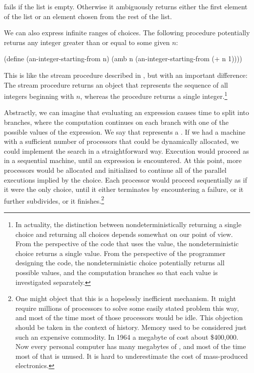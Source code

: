 \noindent
{} fails if the list is empty.  Otherwise it ambiguously
returns either the first element of the list or an element chosen from the rest
of the list.

We can also express infinite ranges of choices.  The following procedure
potentially returns any integer greater than or equal to some given \( n \):

\begin{codeBlock}
(define (an-integer-starting-from n)
  (amb n (an-integer-starting-from (+ n 1))))
\end{codeBlock}

\noindent
This is like the stream procedure  described in
, but with an important difference: The stream procedure
returns an object that represents the sequence of all integers beginning with
\( n \), whereas the  procedure returns a single integer.\footnote{In
actuality, the distinction between nondeterministically returning a single
choice and returning all choices depends somewhat on our point of view.  From
the perspective of the code that uses the value, the nondeterministic choice
returns a single value.  From the perspective of the programmer designing the
code, the nondeterministic choice potentially returns all possible values, and
the computation branches so that each value is investigated separately.}

Abstractly, we can imagine that evaluating an  expression causes time
to split into branches, where the computation continues on each branch with one
of the possible values of the expression.  We say that  represents a
.  If we had a machine with a sufficient
number of processors that could be dynamically allocated, we could implement
the search in a straightforward way.  Execution would proceed as in a
sequential machine, until an  expression is encountered.  At this
point, more processors would be allocated and initialized to continue all of
the parallel executions implied by the choice.  Each processor would proceed
sequentially as if it were the only choice, until it either terminates by
encountering a failure, or it further subdivides, or it finishes.\footnote{One
might object that this is a hopelessly inefficient mechanism.  It might require
millions of processors to solve some easily stated problem this way, and most
of the time most of those processors would be idle.  This objection should be
taken in the context of history.  Memory used to be considered just such an
expensive commodity.  In 1964 a megabyte of  cost about \$400,000.  Now every
personal computer has many megabytes of , and most of the time most of that
 is unused.  It is hard to underestimate the cost of mass-produced
electronics.}

